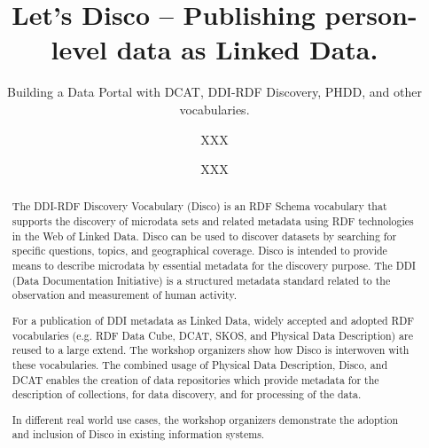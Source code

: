 \documentclass{llncs}
\newcommand{\bz}[1]{\todo[size=\small, color=orange!40]{\textbf{Ben:} #1}}
\begin{document}
%
%
\title{Let’s Disco – Publishing person-level data as Linked Data.}
\subtitle{Building a Data Portal with DCAT, DDI-RDF Discovery, PHDD, and other vocabularies.\bz{Ben's Kommentar}
}
%
%
\author{XXX \and XXX}
%
%

\maketitle              %

\begin{abstract}
The DDI-RDF Discovery Vocabulary (Disco) is an RDF Schema vocabulary that supports the discovery of microdata sets and related metadata using RDF technologies in the Web of Linked Data. Disco can be used to discover datasets by searching for specific questions, topics, and geographical coverage. Disco is intended to provide means to describe microdata by essential metadata for the discovery purpose.
 The DDI (Data Documentation Initiative) is a structured metadata standard related to the observation and measurement of human activity.

For a publication of DDI metadata as Linked Data, widely accepted and adopted RDF vocabularies (e.g. RDF Data Cube, DCAT, SKOS, and Physical Data Description) are reused to a large extend. 
The workshop organizers show how Disco is interwoven with these vocabularies. 
The combined usage of Physical Data Description, Disco, and DCAT enables the creation of data repositories which provide metadata for the description of collections, for data discovery, and for processing of the data.
 
In different real world use cases, the workshop organizers demonstrate the adoption and inclusion of Disco in existing information systems. 

\end{abstract}
%
\end{document}
